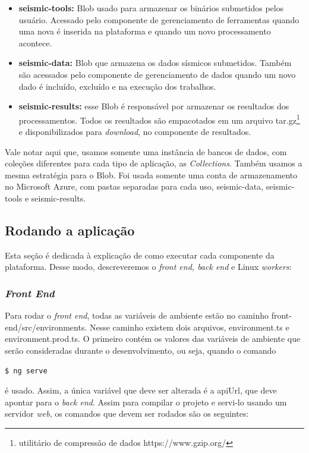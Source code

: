 \documentclass[11pt,twoside]{article}
\begin{document}
\begin{itemize}
  \item \textbf{seismic-tools:} Blob usado para armazenar os binários submetidos pelos usuário. Acessado pelo componente de gerenciamento de ferramentas quando uma nova é inserida na plataforma 
  e quando um novo processamento acontece.
  \item \textbf{seismic-data:} Blob que armazena os dados sísmicos submetidos. Também são acessados pelo componente de gerenciamento de dados quando um novo dado é incluído, excluído e na execução dos 
  trabalhos.
  \item \textbf{seismic-results:} esse Blob é responsável por armazenar os resultados dos processamentos. Todos os resultados são empacotados em um arquivo tar.gz\footnote{ utilitário de compressão de dados https://www.gzip.org/} e disponibilizados para \emph{download}, 
  no componente de resultados.
\end{itemize}

Vale notar aqui que, usamos somente uma instância de bancos de dados, com coleções diferentes para cada tipo de aplicação, as \emph{Collections}. Também usamos a mesma estratégia para o Blob. Foi usada somente 
uma conta de armazenamento no Microsoft Azure, com pastas separadas para cada uso, seismic-data, seismic-tools e seismic-results. 

\subsection{Rodando a aplicação}

Esta seção é dedicada à explicação de como executar cada componente da plataforma. Desse modo, descreveremos o \emph{front end, back end} e Linux \emph{workers}: 

\subsubsection{\emph{Front End}}

Para rodar o \emph{front end}, todas as variáveis de ambiente estão no caminho front-end/src/environments. Nesse caminho existem dois arquivos, environment.ts e environment.prod.ts.
O primeiro contém os valores das variáveis de ambiente que serão consideradas durante o desenvolvimento, ou seja, quando o comando

\begin{lstlisting}[language=bash]
  $ ng serve 
\end{lstlisting}

é usado. Assim, a única variável que deve ser alterada é a apiUrl, que deve apontar para o \emph{back end}. Assim para compilar o projeto e servi-lo usando um servidor \emph{web}, os comandos que 
devem ser rodados são os seguintes: 
\end{document}
